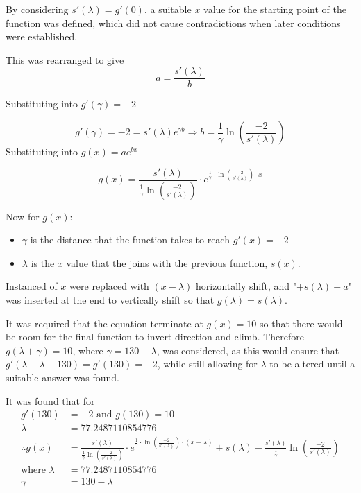 \documentclass[10pt, letterpaper]{article}
\begin{document}
	

By considering $s'(\lambda)=g'(0)$, a suitable $x$ value for the starting point of the function was defined, which did not cause contradictions when later conditions were established. 

This was rearranged to give $$a=\frac{s'(\lambda)}{b}$$

Substituting into $g'(\gamma)=-2$
 
 $$g'(\gamma)=-2=s'(\lambda)e^{\gamma b}\Rightarrow 
 b=\frac{1}{\gamma}\ln(\frac{-2}{s'(\lambda)})$$ Substituting into $g(x)=ae^{bx}$

 $$g(x)=\frac{s'(\lambda)}{\frac{1}{\gamma}\ln(\frac{-2}{s'(\lambda)})}\cdot e^{\frac{1}{\gamma}\cdot \ln (\frac{-2}{s'(\lambda)})\cdot x}$$ 
 
 Now for $g(x)$:
 \begin{itemize}
 	\item $\gamma$ is the distance that the function takes to reach $g'(x)=-2$
 	\item $\lambda$ is the $x$ value that the joins with the previous function, $s(x)$.
 \end{itemize}
		

Instanced of $x$ were replaced with $(x-\lambda)$ horizontally shift, and "$+s(\lambda)-a$" was inserted at the end to vertically shift so that $g(\lambda)=s(\lambda)$.
		

It was required that the equation terminate at $g(x)=10$ so that there would be room for the final function to invert direction and climb. Therefore $g(\lambda + \gamma)=10$, where $\gamma=130-\lambda$, was considered, as this would ensure that $g'(\lambda-\lambda-130)=g'(130)=-2$, while still allowing for $\lambda$ to be altered until a suitable answer was found.
		

It was found that for
\begin{align*}
	g'(130)&=-2 \textrm{ and } g(130)=10 \\
	\lambda&=77.2487110854776 \\
	\therefore g(x)&=\frac{s'(\lambda)}{\frac{1}{\gamma}\ln(\frac{-2}{s'(\lambda)})}\cdot e^{\frac{1}{\gamma}\cdot \ln (\frac{-2}{s'(\lambda)})\cdot (x-\lambda)}+s\left(\lambda\right)-\frac{s'(\lambda)}{\frac{1}{\gamma}}\ln\left(\frac{-2}{s'\left(\lambda\right)}\right) \\
	\textrm{where }\lambda&=77.2487110854776 \\
	\gamma&=130-\lambda
\end{align*} 
\end{document}
